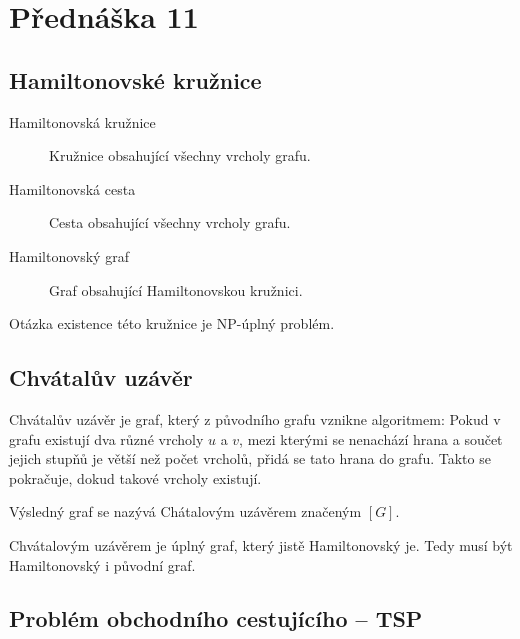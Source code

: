 \section{Přednáška 11}

\subsection{Hamiltonovské kružnice}

\begin{description}
    \item[Hamiltonovská kružnice] Kružnice obsahující všechny vrcholy grafu.
    \item[Hamiltonovská cesta] Cesta obsahující všechny vrcholy grafu.
    \item[Hamiltonovský graf] Graf obsahující Hamiltonovskou kružnici.
\end{description}

Otázka existence této kružnice je NP-úplný problém.

\subsection{Chvátalův uzávěr}


Chvátalův uzávěr je graf, který z původního grafu vznikne algoritmem:
Pokud v grafu existují dva různé vrcholy $u$ a $v$, mezi kterými se nenachází hrana a součet jejich stupňů je větší než počet vrcholů, přidá se tato hrana do grafu.
Takto se pokračuje, dokud takové vrcholy existují.

Výsledný graf se nazývá Chátalovým uzávěrem značeným $[G]$.



Chvátalovým uzávěrem je úplný graf, který jistě Hamiltonovský je.
Tedy musí být Hamiltonovský i původní graf.


\subsection{Problém obchodního cestujícího -- TSP}

